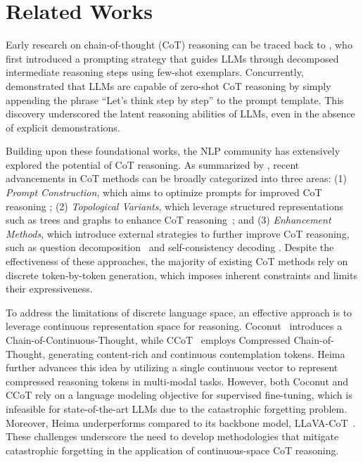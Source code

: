 \section{Related Works}
Early research on chain-of-thought (CoT) reasoning can be traced back to \citet{DBLP:conf/nips/Wei0SBIXCLZ22}, who first introduced a prompting strategy that guides LLMs through decomposed intermediate reasoning steps using few-shot exemplars. Concurrently, \citet{DBLP:conf/nips/KojimaGRMI22} demonstrated that LLMs are capable of zero-shot CoT reasoning by simply appending the phrase ``Let's think step by step'' to the prompt template. This discovery underscored the latent reasoning abilities of LLMs, even in the absence of explicit demonstrations.

Building upon these foundational works, the NLP community has extensively explored the potential of CoT reasoning. As summarized by \citet{DBLP:conf/acl/ChuCCYH0P00L24}, recent advancements in CoT methods can be broadly categorized into three areas: (1) {\it Prompt Construction}, which aims to optimize prompts for improved CoT reasoning \cite{DBLP:conf/nips/Wei0SBIXCLZ22,DBLP:conf/nips/KojimaGRMI22,DBLP:conf/iclr/0001Z0S23}; (2) {\it Topological Variants}, which leverage structured representations such as trees and graphs to enhance CoT reasoning~\cite{DBLP:conf/nips/YaoYZS00N23,DBLP:conf/aaai/BestaBKGPGGLNNH24}; and (3) {\it Enhancement Methods}, which introduce external strategies to further improve CoT reasoning, such as question decomposition~\cite{DBLP:conf/iclr/ZhouSHWS0SCBLC23} and self-consistency decoding \cite{DBLP:conf/iclr/0002WSLCNCZ23}. Despite the effectiveness of these approaches, the majority of existing CoT methods rely on discrete token-by-token generation, which imposes inherent constraints and limits their expressiveness.

To address the limitations of discrete language space, an effective approach is to leverage continuous representation space for reasoning. Coconut~\cite{DBLP:journals/corr/abs-2412-06769} introduces a Chain-of-Continuous-Thought, while CCoT~\cite{DBLP:journals/corr/abs-2412-13171} employs Compressed Chain-of-Thought, generating content-rich and continuous contemplation tokens. Heima~\cite{DBLP:journals/corr/abs-2501-19201} further advances this idea by utilizing a single continuous vector to represent compressed reasoning tokens in multi-modal tasks. However, both Coconut and CCoT rely on a language modeling objective for supervised fine-tuning, which is infeasible for state-of-the-art LLMs due to the catastrophic forgetting problem. Moreover, Heima underperforms compared to its backbone model, LLaVA-CoT~\cite{DBLP:journals/corr/abs-2411-10440}. These challenges underscore the need to develop methodologies that mitigate catastrophic forgetting in the application of continuous-space CoT reasoning.